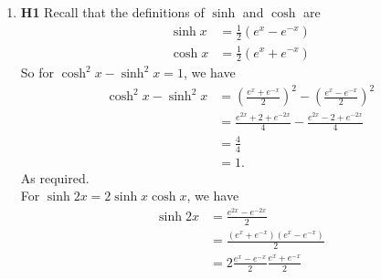 \documentclass[12pt,oneside]{book}
\begin{document}
\begin{enumerate}
\begin{proof}
\[            .\] So let $u = x^{k+1}$ and $\frac{\mathop{\mathrm{d}v}}{\mathop{\mathrm{d}x}} = e^{-x}$, then $\frac{\mathop{\mathrm{d}u}}{\mathop{\mathrm{d}x}} = (k+1) x^k$ and $v = -e^{-x}$. Hence \begin{align*}
                \Pi(k + 1) &= \lim_{L \to \infty} \left[ - x^{k+1}e^{-x} \right]_0^L + (k+1) \int_{0}^{L} x^k e^{-x} \mathop{\mathrm{d}x} \\
                &= \lim_{L \to \infty} - \frac{L^{k+1}}{e^{L}} + (k+1) \Pi(k)
            \end{align*} 
            Note that on the right hand side we have $\infty/\infty$. So we must apply L'Hopital's rule $k+1$ times, giving us \[
                \lim_{L \to \infty} \frac{L^{k + 1}}{e^L} = \lim_{L \to \infty} \frac{(k+1)L^k}{e^L} = \cdots = \lim_{L \to \infty} \frac{(k+1)!}{e^L} \to 0 
            .\] Hence \[
                \Pi(k+1) = (k+1) \Pi(k)
            .\] Applying our inductive hypothesis yields \[
                \Pi(k + 1) = (k+1) k! = (k+1)!
            .\] So the statement holds for $n = k + 1$. So by the principle of mathematical induction, the statement holds for all $n \in \mathbb{N}$.
        \end{proof} 
        \item \textbf{H1} Recall that the definitions of $\sinh$ and $\cosh$ are \begin{align*}
            \sinh x &= \frac{1}{2}(e^x - e^{-x}) \\
            \cosh x &= \frac{1}{2}(e^x + e^{-x})
        \end{align*}
        So for $\cosh^2 x - \sinh^2 x = 1$, we have \begin{align*}
            \cosh^2 x - \sinh^2 x &= \left( \frac{e^x + e^{-x}}{2} \right)^2 - \left( \frac{e^x - e^{-x}}{2} \right)^2 \\
            &= \frac{e^{2x} + 2 + e^{-2x}}{4} - \frac{e^{2x} - 2 + e^{-2x}}{4} \\
            &= \frac{4}{4} \\
            &= 1.
        \end{align*}
        As required. \\
        For $\sinh 2x = 2 \sinh x \cosh x$, we have \begin{align*}
            \sinh 2x &= \frac{e^{2x} - e^{-2x}}{2} \\
            &= \frac{(e^x+e^{-x})(e^x-e^{-x})}{2} \\
            &= 2 \frac{e^x - e^{-x}}{2} \frac{e^x + e^{-x}}{2} \\

\end{align*}
\end{enumerate}
\end{document}
